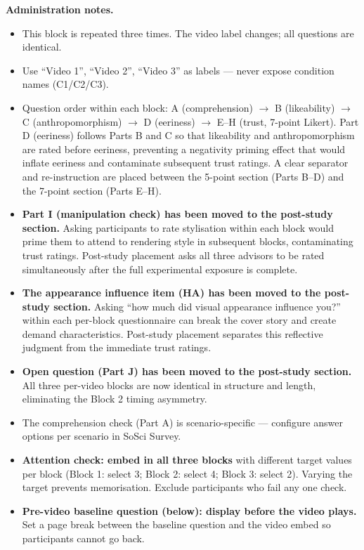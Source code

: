 \documentclass[11pt, a4paper]{article}
\begin{document}
\begin{warnbox}
\small\textbf{Administration notes.}
\begin{itemize}[topsep=2pt, itemsep=1pt]
  \item This block is repeated three times. The video label changes; all questions are identical.
  \item Use ``Video 1'', ``Video 2'', ``Video 3'' as labels — never expose condition names (C1/C2/C3).
  \item Question order within each block: A (comprehension) $\to$ B (likeability) $\to$ C (anthropomorphism) $\to$ D (eeriness) $\to$ E--H (trust, 7-point Likert). Part D (eeriness) follows Parts B and C so that likeability and anthropomorphism are rated before eeriness, preventing a negativity priming effect that would inflate eeriness and contaminate subsequent trust ratings. A clear separator and re-instruction are placed between the 5-point section (Parts B--D) and the 7-point section (Parts E--H).
  \item \textbf{Part I (manipulation check) has been moved to the post-study section.} Asking participants to rate stylisation within each block would prime them to attend to rendering style in subsequent blocks, contaminating trust ratings. Post-study placement asks all three advisors to be rated simultaneously after the full experimental exposure is complete.
  \item \textbf{The appearance influence item (HA) has been moved to the post-study section.} Asking ``how much did visual appearance influence you?'' within each per-block questionnaire can break the cover story and create demand characteristics. Post-study placement separates this reflective judgment from the immediate trust ratings.
  \item \textbf{Open question (Part J) has been moved to the post-study section.} All three per-video blocks are now identical in structure and length, eliminating the Block 2 timing asymmetry.
  \item The comprehension check (Part A) is scenario-specific — configure answer options per scenario in SoSci Survey.
  \item \textbf{Attention check: embed in all three blocks} with different target values per block (Block 1: select 3; Block 2: select 4; Block 3: select 2). Varying the target prevents memorisation. Exclude participants who fail any one check.
  \item \textbf{Pre-video baseline question (below): display before the video plays.} Set a page break between the baseline question and the video embed so participants cannot go back.
\end{itemize}
\end{warnbox}
\end{document}
